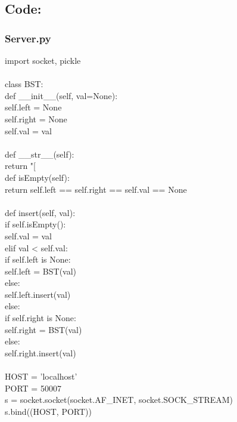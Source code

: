 \documentclass{article}
\newenvironment{codeblock}{\fontfamily{ccr}\selectfont}{\par}
\begin{document}
\vspace{100px}	

\subsection{Code:}
	\subsubsection{Server.py}
	\begin{codeblock}
		import socket, pickle\\
		\\
		class BST:\\
		def \_\_init\_\_(self, val=None):\\
		self.left = None\\
		self.right = None\\
		self.val = val\\
		\\
		def \_\_str\_\_(self):\\
		return "[%
		\\
		def isEmpty(self):\\
		return self.left == self.right == self.val == None\\
		\\
		def insert(self, val):\\
		if self.isEmpty():\\
		self.val = val\\
		elif val < self.val:\\
		if self.left is None:\\
		self.left = BST(val)\\
		else:\\
		self.left.insert(val)\\
		else:\\
		if self.right is None:\\
		self.right = BST(val)\\
		else:\\
		self.right.insert(val)\\
		\\
		HOST = 'localhost'\\
		PORT = 50007\\
		s = socket.socket(socket.AF\_INET, socket.SOCK\_STREAM)\\
		s.bind((HOST, PORT))\\

\end{codeblock}
\end{document}
